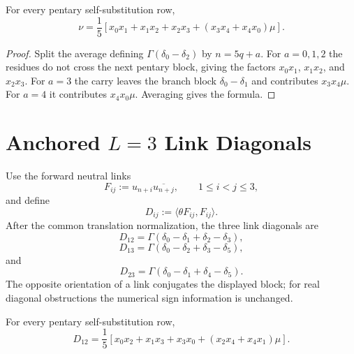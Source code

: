 \begin{theorem}
\label{thm:innovation-input-pentary-second-correlation-formula}
For every pentary self-substitution row,
$$
\nu
=
\frac15
\left[
x_0x_1+x_1x_2+x_2x_3+(x_3x_4+x_4x_0)\mu
\right].
$$
\end{theorem}

\begin{proof}
Split the average defining $\Gamma(\delta_0-\delta_2)$ by $n=5q+a$.
For $a=0,1,2$ the residues do not cross the next pentary block, giving
the factors $x_0x_1$, $x_1x_2$, and $x_2x_3$. For $a=3$ the carry leaves
the branch block $\delta_0-\delta_1$ and contributes $x_3x_4\mu$. For
$a=4$ it contributes $x_4x_0\mu$. Averaging gives the formula.
\end{proof}


\section{Anchored $L=3$ Link Diagonals}
\label{sec:innovation-input-pentary-lthree-link-diagonals}

\begin{definition}
\label{def:innovation-input-forward-anchored-links}
Use the forward neutral links
$$
F_{ij}:=u_{n+i}\overline{u_{n+j}},
\qquad
1\le i<j\le3,
$$
and define
$$
D_{ij}:=\langle\theta F_{ij},F_{ij}\rangle.
$$
After the common translation normalization, the three link diagonals are
$$
D_{12}
=
\Gamma(\delta_0-\delta_1+\delta_2-\delta_3),
$$
$$
D_{13}
=
\Gamma(\delta_0-\delta_2+\delta_3-\delta_5),
$$
and
$$
D_{23}
=
\Gamma(\delta_0-\delta_1+\delta_4-\delta_5).
$$
The opposite orientation of a link conjugates the displayed block; for
real diagonal obstructions the numerical sign information is unchanged.
\end{definition}

\begin{theorem}
\label{thm:innovation-input-pentary-dtwelve-formula}
For every pentary self-substitution row,
$$
D_{12}
=
\frac15
\left[
x_0x_2+x_1x_3+x_3x_0+(x_2x_4+x_4x_1)\mu
\right].
$$
\end{theorem}

